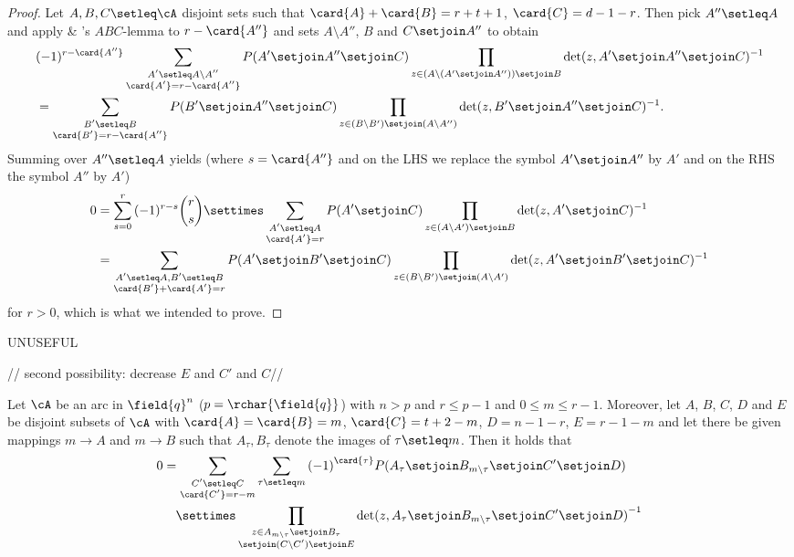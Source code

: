 \begin{proof}
  Let $A,B,C\setleq \cA$ disjoint sets such
  that $\card{A}+\card{B}=r+t+1$, $\card{C}=d-1-r$. Then pick $A''\setleq
  A$ and apply  \& 's $ABC$-lemma to
  $r-\card{A''}$ and sets $A\setminus A''$, $B$ and $C\setjoin A''$ to
  obtain
  \begin{align}
    &(-1)^{r-\card{A''}}\sum_{\substack{A'\setleq A\setminus A''\\
        \card{A'}=r-\card{A''}}}{P(A'\setjoin A''\setjoin C)\prod_{z\in
        (A\setminus (A'\setjoin A''))\setjoin B}{\det(z,A'\setjoin A''\setjoin C)^{-1}}}\\
    &= \sum_{\substack{B'\setleq B\\
        \card{B'}=r-\card{A''}}}{P(B'\setjoin A''\setjoin C)\prod_{z\in
        (B\setminus B')\setjoin (A\setminus A'')}{\det(z,B'\setjoin A''\setjoin C)^{-1}}}\text{.}
  \end{align} 
  Summing over $A''\setleq A$ yields (where $s=\card{A''}$ and on the
  LHS we replace the symbol $A'\setjoin A''$ by $A'$ and on the RHS the
  symbol $A''$ by $A'$)
  \begin{align}
    0 &= \sum_{s=0}^r{(-1)^{r-s}\binom{r}{s}}\settimes\sum_{\substack{A'\setleq A\\ \card{A'}=r}}{P(A'\setjoin C)\prod_{z\in
        (A\setminus A')\setjoin B}{\det(z,A'\setjoin C)^{-1}}}\\
    &= \sum_{\substack{A'\setleq A, B'\setleq B\\
        \card{B'}+\card{A'}=r}}{P(A'\setjoin B'\setjoin C)\prod_{z\in
        (B\setminus B')\setjoin (A\setminus A')}{\det(z,A'\setjoin B'\setjoin C)^{-1}}}
  \end{align}
  for $r>0$, which is what we intended to prove.
\end{proof}
UNUSEFUL

// second possibility: decrease $E$ and $C'$ and $C$//
\begin{lemma}
    Let $\cA$ be an arc in $\field{q}^n$ ($p=\rchar{\field{q}}$) with $n>p$ and $r\leq p-1$ and $0\leq m\leq r-1$. Moreover, let $A$, $B$, $C$, $D$ and $E$ be disjoint subsets of $\cA$ with $\card{A}=\card{B}=m$, $\card{C}=t+2-m$, $D=n-1-r$, $E=r-1-m$ and let there be given mappings $m\to A$ and $m\to B$ such that $A_\tau, B_\tau$ denote the images of $\tau\setleq m$. Then it holds that
    \begin{align}
        0 & = \sum_{\substack{C'\setleq C                                                                       \\
                \card{C'}=r-m}}
        {\sum_{\tau\setleq m}{{(-1)}^{\card{\tau}}P(A_{\tau}\setjoin B_{m\setminus\tau}\setjoin C'\setjoin D)}} \\
          & \quad\settimes\prod_{\substack{z\in A_{m\setminus\tau}\setjoin B_{\tau}                                  \\
                  \setjoin(C\setminus C')\setjoin E}}
          {{\det(z,A_{\tau}\setjoin B_{m\setminus\tau}\setjoin C'\setjoin D)}^{-1}}
\end{align}
\end{lemma}


